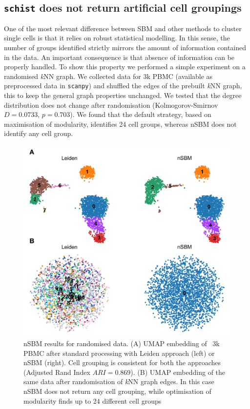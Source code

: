 \documentclass[10pt]{article}
\begin{document}
\subsection*{\texttt{schist} does not return artificial cell groupings}

One of the most relevant difference between SBM and other methods to cluster single cells is that it relies on robust statistical modelling. In this sense, the number of groups identified strictly mirrors the amount of information contained in the data. An important consequence is that absence of information can be properly handled. To show this property we performed a simple experiment on a randomised \emph{k}NN graph. We collected data for 3k PBMC (available as preprocessed data in \texttt{scanpy}) and shuffled the edges of the prebuilt \emph{k}NN graph, this to keep the general graph properties unchanged. We tested that the degree distribution does not change after randomisation (Kolmogorov-Smirnov $D=0.0733$, $p=0.703$). We found that the default strategy, based on maximisation of modularity, identifies 24 cell groups, whereas nSBM does not identify any cell group. 

\begin{figure}[H]
\centering
\includegraphics[keepaspectratio,width=\textwidth,height=0.4\textheight]{FIgure_Random.png}
\caption[]{nSBM results for randomised data. (A) UMAP embedding of ~3k PBMC after standard processing with Leiden approach (left) or nSBM (right). Cell grouping is consistent for both the approaches (Adjusted Rand Index $ARI=0.869$). (B) UMAP embedding of the same data after randomisation of \emph{k}NN graph edges. In this case nSBM does not return any cell grouping, while optimisation of modularity finds up to 24 different cell groups}\label{FigureRandom}
\end{figure}
\end{document}
